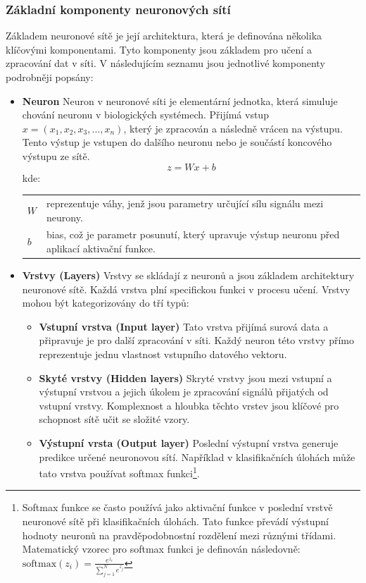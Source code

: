 \documentclass[male,czech,api_ing]{thesis}
\makeatletter
\newenvironment{conditions}[1][kde:]
    {#1 \begin{tabular}[t]{>{$}l<{$} @{${}={}$} >{\raggedright\arraybackslash}p{10cm}}}
    {\end{tabular}}
\makeatother
\begin{document}
\subsubsection{Základní komponenty neuronových sítí}
Základem neuronové sítě je její architektura, která je definována několika klíčovými komponentami. Tyto komponenty jsou základem pro učení a zpracování dat v síti. V následujícím seznamu jsou jednotlivé komponenty podrobněji popsány:

\begin{itemize}
    \item \textbf{Neuron} Neuron v neuronové síti je elementární jednotka, která simuluje chování neuronu v biologických systémech. Přijímá vstup $x = (x_1, x_2, x_3, ..., x_n)$, který je zpracován a následně vrácen na výstupu. Tento výstup je vstupen do dalšího neuronu nebo je součástí koncového výstupu ze sítě.
        \begin{equation}
            z = Wx + b
        \end{equation}
        \begin{conditions}
            W & reprezentuje váhy, jenž jsou parametry určující sílu signálu mezi neurony. \\
            b & bias, což je parametr posunutí, který upravuje výstup neuronu před aplikací aktivační funkce.
        \end{conditions}
    \item \textbf{Vrstvy (Layers)} Vrstvy se skládají z neuronů a jsou základem architektury neuronové sítě. Každá vrstva plní specifickou funkci v procesu učení. Vrstvy mohou být kategorizovány do tří typů:
        \begin{itemize}
            \item \textbf{Vstupní vrstva (Input layer)} Tato vrstva přijímá surová data a připravuje je pro další zpracování v síti. Každý neuron této vrstvy přímo reprezentuje jednu vlastnost vstupního datového vektoru.
            \item \textbf{Skyté vrstvy (Hidden layers)} Skryté vrstvy jsou mezi vstupní a výstupní vrstvou a jejich úkolem je zpracování signálů přijatých od vstupní vrstvy. Komplexnost a hloubka těchto vrstev jsou klíčové pro schopnost sítě učit se složité vzory.
            \item \textbf{Výstupní vrsta (Output layer) } Poslední výstupní vrstva generuje predikce určené neuronovou sítí. Například v klasifikačních úlohách může tato vrstva používat softmax funkci\footnote{Softmax funkce se často používá jako aktivační funkce v poslední vrstvě neuronové sítě při klasifikačních úlohách. Tato funkce převádí výstupní hodnoty neuronů na pravděpodobnostní rozdělení mezi různými třídami. Matematický vzorec pro softmax funkci je definován následovně: $\text{softmax}(z_i) = \frac{e^{z_i}}{\sum_{j=1}^{N} e^{z_j}}$}.

\end{itemize}
\end{itemize}
\end{document}
